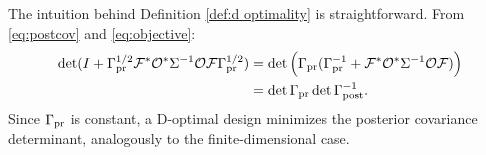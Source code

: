 \documentclass{amsart}
\numberwithin{equation}{section}
\begin{document}
\noindent The intuition behind Definition \ref{def:d optimality} is
straightforward. From \eqref{eq:postcov} and \eqref{eq:objective}:
\begin{align*}
  \begin{split}
    \det ( I + \Gamma_{\textup{pr}}^{1/2}  \mathcal{F} ^* \mathcal{O}^* \Sigma^{-1} \mathcal{O} \mathcal{F} \Gamma_{\textup{pr}}^{1/2}) &= \det \Big( \Gamma_{\textup{pr}} ( \Gamma_{\textup{pr}}^{-1} + \mathcal{F} ^* \mathcal{O}^* \Sigma^{-1} \mathcal{O} \mathcal{F}) \Big )\\
    &= \det \Gamma_{\textup{pr}} \det \Gamma_{\textup{post}}^{-1}.
  \end{split}
\end{align*}
Since $\Gamma_{\textup{pr}}$ is constant, a D-optimal design minimizes the posterior
covariance determinant, analogously to the finite-dimensional case.



\end{document}
